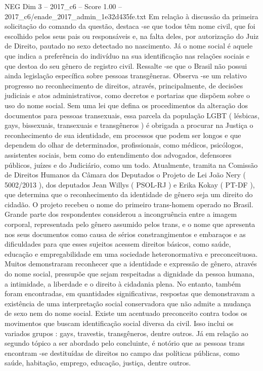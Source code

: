 \begin{textsample}{NEG Dim 3 – 2017\_c6 – Score 1.00 – 2017\_c6/enade\_2017\_admin\_1e32d435fe.txt}
Em relação à discussão da primeira solicitação do comando da questão, destaca -se que todos têm nome civil, que foi escolhido pelos seus pais ou responsáveis e, na falta deles, por autorização do Juiz de Direito, pautado no sexo detectado no nascimento.
Já o nome social é aquele que indica a preferência do indivíduo na sua identificação nas relações sociais e que destoa do seu gênero de registro civil.
Ressalte -se que o Brasil não possui ainda legislação específica sobre pessoas transgêneras.
Observa -se um relativo progresso no reconhecimento de direitos, através, principalmente, de decisões judiciais e atos administrativos, como decretos e portarias que dispõem sobre o uso do nome social.
Sem uma lei que defina os procedimentos da alteração dos documentos para pessoas transexuais, essa parcela da população LGBT ( lésbicas, gays, bissexuais, transexuais e transgêneros ) é obrigada a procurar na Justiça o reconhecimento de sua identidade, em processos que podem ser longos e que dependem do olhar de determinados, profissionais, como médicos, psicólogos, assistentes sociais, bem como do entendimento dos advogados, defensores públicos, juízes e do Judiciário, como um todo.
Atualmente, tramita na Comissão de Direitos Humanos da Câmara dos Deputados o Projeto de Lei João Nery ( 5002/2013 ), dos deputados Jean Willys ( PSOL-RJ ) e Erika Kokay ( PT-DF ), que determina que o reconhecimento da identidade de gênero seja um direito do cidadão.
O projeto recebeu o nome do primeiro trans-homem operado no Brasil.
Grande parte dos respondentes considerou a incongruência entre a imagem corporal, representada pelo gênero assumido pelos trans, e o nome que apresenta nos seus documentos como causa de sérios constrangimentos e embaraços e as dificuldades para que esses sujeitos acessem direitos básicos, como saúde, educação e empregabilidade em uma sociedade heteronormativa e preconceituosa.
Muitos demonstraram reconhecer que a identidade e expressão de gênero, através do nome social, pressupõe que sejam respeitadas a dignidade da pessoa humana, a intimidade, a liberdade e o direito à cidadania plena.
No entanto, também foram encontradas, em quantidades significativas, respostas que demonstravam a existência de uma interpretação social conservadora que não admite a mudança de sexo nem do nome social.
Existe um acentuado preconceito contra todos os movimentos que buscam identificação social diversa da civil.
Isso inclui os variados grupos : gays, travestis, transgêneros, dentre outros.
Já em relação ao segundo tópico a ser abordado pelo concluinte, é notório que as pessoas trans encontram -se destituídas de direitos no campo das políticas públicas, como saúde, habitação, emprego, educação, justiça, dentre outros.

\end{textsample}
